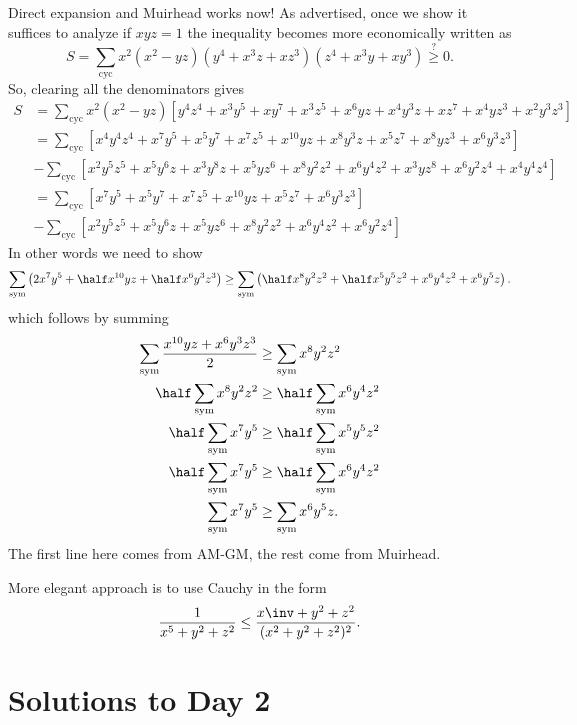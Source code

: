 \documentclass[11pt]{scrartcl}
\begin{document}
Direct expansion and Muirhead works now!
As advertised, once we show it suffices to analyze if $xyz=1$
the inequality becomes more economically written as
\[ S = \sum_{\text{cyc}} x^2(x^2-yz)(y^4+x^3z+xz^3)(z^4+x^3y+xy^3)
  \overset{?}{\ge} 0. \]
So, clearing all the denominators gives
\begin{align*}
  S &= \sum_{\text{cyc}} x^2(x^2-yz)
  \left[ y^4z^4 + x^3y^5 + xy^7 + x^3z^5 + x^6yz + x^4y^3z
    + xz^7 + x^4yz^3 + x^2y^3z^3 \right] \\
  &= \sum_{\text{cyc}}
  \left[ x^4y^4z^4 + x^7y^5 + x^5y^7 + x^7z^5 + x^{10}yz + x^8y^3z
    + x^5z^7 + x^8yz^3 + x^6y^3z^3 \right] \\
  &- \sum_{\text{cyc}}
  \left[ x^2y^5z^5 + x^5y^6z + x^3y^8z + x^5yz^6 + x^8y^2z^2 + x^6y^4z^2
    + x^3yz^8 + x^6y^2z^4 + x^4y^4z^4 \right] \\
  &= \sum_{\text{cyc}}
  \left[ x^7y^5 + x^5y^7 + x^7z^5 + x^{10}yz
    + x^5z^7 + x^6y^3z^3 \right] \\
  &- \sum_{\text{cyc}}
  \left[ x^2y^5z^5 + x^5y^6z + x^5yz^6 + x^8y^2z^2 + x^6y^4z^2
    + x^6y^2z^4 \right]
\end{align*}
In other words we need to show
\[
  \sum_{\text{sym}} \left( 2x^7y^5
  +\half x^{10}yz + \half x^6y^3z^3 \right)
  \ge
  \sum_{\text{sym}} \left( \half x^8 y^2 z^2
  + \half x^5 y^5 z^2 + x^6 y^4 z^2 + x^6 y^5 z \right).
\]
which follows by summing
\begin{align*}
  \sum_{\text{sym}} \frac{x^{10} yz + x^6 y^3 z^3}{2}
    &\ge \sum_{\text{sym}} x^8 y^2 z^2 \\
  \half \sum_{\text{sym}} x^8 y^2 z^2
    &\ge \half \sum_{\text{sym}} x^6 y^4 z^2 \\
  \half \sum_{\text{sym}} x^7y^5
    &\ge \half \sum_{\text{sym}} x^5 y^5 z^2 \\
  \half \sum_{\text{sym}} x^7y^5
    &\ge \half \sum_{\text{sym}} x^6 y^4 z^2 \\
  \sum_{\text{sym}} x^7y^5
    &\ge \sum_{\text{sym}} x^6 y^5 z.
\end{align*}
The first line here comes from AM-GM,
the rest come from Muirhead.
\begin{remark*}
More elegant approach is to use Cauchy in the form
\[ \frac{1}{x^5+y^2+z^2} \le \frac{x\inv+y^2+z^2}{(x^2+y^2+z^2)^2}. \]
\end{remark*}
\pagebreak

\section{Solutions to Day 2}
\end{document}
